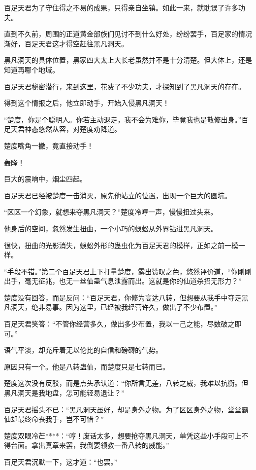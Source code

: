 \begin{this_body}
百足天君为了守住得之不易的成果，只得亲自坐镇。如此一来，就耽误了许多功夫。

直到不久前，周围的正道黄金部族们见讨不到什么好处，纷纷罢手，百足家的情况渐好，百足天君这才得空赶往黑凡洞天。

黑凡洞天的具体位置，黑家四大太上大长老虽然并不是十分清楚。但大体上，还是知道再哪个地域。

百足天君秘密潜行，来到这里，花费了不少功夫，才探知到了黑凡洞天的存在。

得到这个情报之后，他立即动手，开始入侵黑凡洞天！

“楚度，你是个聪明人。你若主动退走，我不会为难你，毕竟我也是散修出身。”百足天君神态悠然从容，对楚度劝降道。

楚度嘴角一撇，竟直接动手！

轰隆！

巨大的震响中，烟尘四起。

百足天君已经被楚度一击消灭，原先他站立的位置，出现一个巨大的圆坑。

“区区一个幻象，就想来夺黑凡洞天？”楚度冷哼一声，慢慢扭过头来。

他身后的空间，忽然发生扭曲，一个小巧的蜈蚣从外界钻进黑凡洞天。

很快，扭曲的光影消失，蜈蚣外形的蛊虫化为百足天君的模样，正如之前一模一样。

“手段不错。”第二个百足天君上下打量楚度，露出赞叹之色，悠然评价道，“你刚刚出手，毫无征兆，也无一丝仙蛊气息泄露而出。这就是你的仙道杀招无形力？”

楚度没有回答，而是反问：“百足天君，你修为高达八转，但想要从我手中夺走黑凡洞天，绝非易事。因为这里，已经被我经营许久，做出了不少布置。”

百足天君笑答：“不管你经营多久，做出多少布置，我以一己之能，尽数破之即可。”

语气平淡，却充斥着无以伦比的自信和磅礴的气势。

原因只有一个。他是八转蛊仙，而楚度只是七转而已。

楚度这次没有反驳，而是点头承认道：“你所言无差，八转之威，我难以抗衡。但黑凡洞天是我地盘，怎可能轻易退让？”

百足天君摇头不已：“黑凡洞天虽好，却是身外之物。为了区区身外之物，堂堂霸仙却最终命丧我手，岂不可惜？”

楚度双眼冷芒****：“哼！废话太多，想要抢夺黑凡洞天，单凭这些小手段可上不得台面。拿出真章来罢，我倒要领教一番八转的威能。”

百足天君沉默一下，这才道：“也罢。”


\end{this_body}
